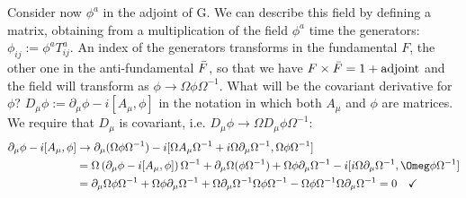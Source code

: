 \documentclass[../main.tex]{subfiles}
\begin{document}
Consider now $\phi^a$ in the adjoint of G. We can describe this field by defining a matrix, obtaining from a multiplication of the field $\phi^a$ time the generators: $\phi_{ij}:=\phi^aT_{ij}^a$. An index of the generators transforms in the fundamental $F$, the other one in the anti-fundamental $\Bar{F}$, so that we have $F\times\Bar{F}=1+\text{adjoint}$ and the field will transform as $\phi\to\Omega\phi\Omega^{-1}$. What will be the covariant derivative for $\phi$? $D_\mu\phi:=\partial_\mu\phi-i[A_\mu,\phi]$ in the notation in which both $A_\mu$ and $\phi$ are matrices. We require that $D_\mu$ is covariant, i.e. $D_\mu\phi\to\Omega D_\mu\phi\Omega^{-1}$:
\begin{align*}
\partial_\mu\phi-i[A_\mu,\phi]&\to\partial_\mu(\Omega\phi\Omega^{-1})-i[\Omega A_\mu\Omega^{-1}+i\Omega\partial_\mu\Omega^{-1},\Omega\phi\Omega^{-1}]\\
&=\Omega\left(\partial_\mu\phi-i[A_\mu,\phi]\right)\Omega^{-1}+\partial_\mu\Omega(\phi\Omega^{-1})+\Omega\phi\partial_\mu\Omega^{-1}-i[i\Omega\partial_\mu\Omega^{-1},\Omeg\phi\Omega^{-1}]\\
&=\partial_\mu\Omega\phi\Omega^{-1}+\Omega\phi\partial_\mu\Omega^{-1}+\Omega\partial_\mu\Omega^{-1}\Omega\phi\Omega^{-1}-\Omega\phi\Omega^{-1}\Omega\partial_\mu\Omega^{-1}=0 \quad \checkmark
\end{align*}
\end{document}
